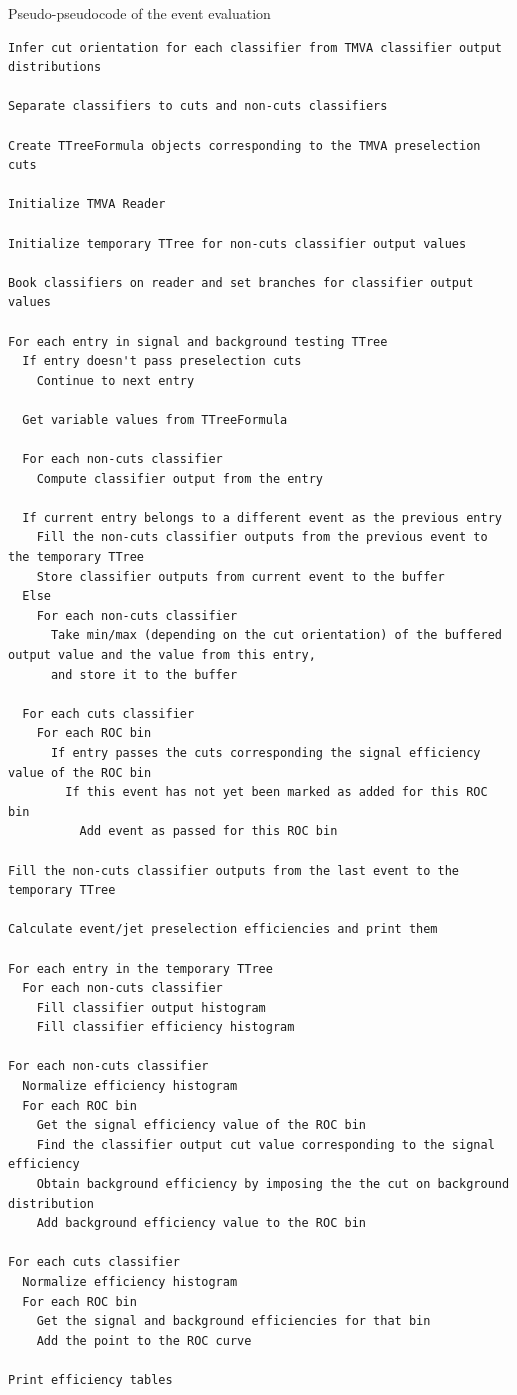 Pseudo-pseudocode of the event evaluation
\begin{verbatim}
Infer cut orientation for each classifier from TMVA classifier output distributions

Separate classifiers to cuts and non-cuts classifiers

Create TTreeFormula objects corresponding to the TMVA preselection cuts

Initialize TMVA Reader

Initialize temporary TTree for non-cuts classifier output values

Book classifiers on reader and set branches for classifier output values

For each entry in signal and background testing TTree
  If entry doesn't pass preselection cuts
    Continue to next entry

  Get variable values from TTreeFormula

  For each non-cuts classifier
    Compute classifier output from the entry

  If current entry belongs to a different event as the previous entry
    Fill the non-cuts classifier outputs from the previous event to the temporary TTree
    Store classifier outputs from current event to the buffer
  Else
    For each non-cuts classifier
      Take min/max (depending on the cut orientation) of the buffered output value and the value from this entry,
      and store it to the buffer

  For each cuts classifier
    For each ROC bin
      If entry passes the cuts corresponding the signal efficiency value of the ROC bin
        If this event has not yet been marked as added for this ROC bin
          Add event as passed for this ROC bin

Fill the non-cuts classifier outputs from the last event to the temporary TTree

Calculate event/jet preselection efficiencies and print them

For each entry in the temporary TTree
  For each non-cuts classifier
    Fill classifier output histogram
    Fill classifier efficiency histogram

For each non-cuts classifier
  Normalize efficiency histogram
  For each ROC bin
    Get the signal efficiency value of the ROC bin
    Find the classifier output cut value corresponding to the signal efficiency
    Obtain background efficiency by imposing the the cut on background distribution
    Add background efficiency value to the ROC bin

For each cuts classifier
  Normalize efficiency histogram
  For each ROC bin
    Get the signal and background efficiencies for that bin
    Add the point to the ROC curve 

Print efficiency tables
\end{verbatim}

